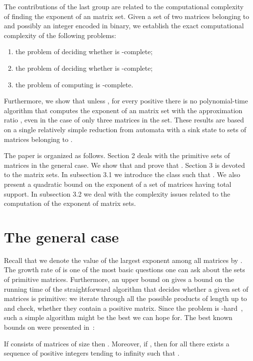 \documentclass[a4paper,USenglish]{lipics}
\theoremstyle{definition}
\begin{document}
The contributions of the last group are related to the computational complexity of finding the exponent of an  matrix set. Given a set of two matrices belonging to  and possibly an integer  encoded in binary, we establish the exact computational complexity 	of the following problems:
\begin{enumerate}
\item the problem of deciding whether  is -complete;
\item the problem of deciding whether  is -complete;
\item the problem of computing  is -complete.
\end{enumerate} 
Furthermore, we show that unless , for every positive  there is no polynomial-time algorithm that computes the exponent of an  matrix set with the approximation ratio , even in the case of only three matrices in the set. These results are based on a single relatively simple reduction from automata with a sink state to sets of matrices belonging to .

The paper is organized as follows. Section 2 deals with the primitive sets of matrices in the general case. We show that  and prove that . Section 3 is devoted to the  matrix sets. In subsection 3.1 we introduce the class  such that . We also present a quadratic bound on the exponent of a set of matrices having total support. In subsection 3.2 we deal with the complexity issues related to the computation of the exponent of  matrix sets.

\section{The general case}

Recall that we denote the value of the largest exponent among all  matrices by . The growth rate of  is one of the most basic questions one can ask about the sets of primitive matrices. Furthermore, an upper bound on  gives a bound on the running time of the straightforward algorithm that decides whether a given set of matrices is primitive: we iterate through all the possible products of length up to  and check, whether  they contain a positive matrix. Since the problem is -hard~\cite[Theorem 6]{BJO15}, such a simple algorithm might be the best we can hope for. The best known bounds on  were presented in~\cite[Theorem 10]{BJO15}:
\begin{theorem}
\label{th:expOld}
If  consists of  matrices of size  then . Moreover, if , then for all  there exists a sequence of positive integers  tending to infinity such that .
\end{theorem}
\end{document}
